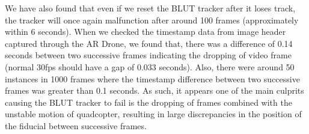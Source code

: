 \documentclass[10pt,twocolumn,letterpaper]{article}
\begin{document}
We have also found that even if we reset the BLUT tracker after it
loses track, the tracker will once again malfunction after around 100
frames (approximately within 6 seconds). When we checked the timestamp
data from image header captured through the AR Drone, we found that,
there was a difference of 0.14 seconds between two successive frames
indicating the dropping of video frame (normal 30fps should have a gap
of 0.033 seconds). Also, there were around 50 instances in 1000 frames
where the timestamp difference between two successive frames was
greater than 0.1 seconds. As such, it appears one of the main culprits
causing the BLUT tracker to fail is the dropping of frames combined
with the unstable motion of quadcopter, resulting in large discrepancies in
the  position of the fiducial between successive frames.
\end{document}
